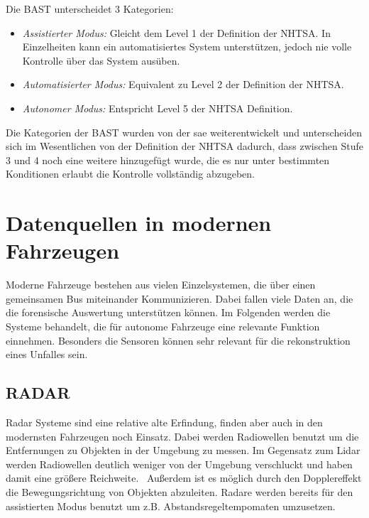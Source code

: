\documentclass[conference,compsoc,final,a4paper]{IEEEtran}
\begin{document}
Die \ac{BAST} unterscheidet 3 Kategorien\cite{bast2021}:

\begin{itemize}
  \item \emph{Assistierter Modus:} Gleicht dem Level 1 der Definition der \ac{NHTSA}. In Einzelheiten kann ein automatisiertes System unterstützen, jedoch nie volle Kontrolle über das System ausüben.
  \item \emph{Automatisierter Modus:} Equivalent zu Level 2 der Definition der \ac{NHTSA}.
  \item \emph{Autonomer Modus:} Entspricht Level 5 der \ac{NHTSA} Definition.
\end{itemize}

Die Kategorien der \ac{BAST} wurden von der \ac{sae} weiterentwickelt\cite{bast2021} und unterscheiden sich im Wesentlichen von der Definition der \ac{NHTSA} dadurch, dass zwischen Stufe 3 und 4 noch eine weitere hinzugefügt wurde, die es nur unter bestimmten Konditionen erlaubt die Kontrolle vollständig abzugeben\cite{SAE2021}.

\section{Datenquellen in modernen Fahrzeugen}

Moderne Fahrzeuge bestehen aus vielen Einzelsystemen, die über einen gemeinsamen Bus miteinander Kommunizieren.
Dabei fallen viele Daten an, die die forensische Auswertung unterstützen können. Im Folgenden werden die Systeme behandelt,
die für autonome Fahrzeuge eine relevante Funktion einnehmen.
Besonders die Sensoren können sehr relevant für die rekonstruktion eines Unfalles sein.


\subsection{RADAR}

Radar Systeme sind eine relative alte Erfindung, finden aber auch in den modernsten Fahrzeugen noch Einsatz.
Dabei werden Radiowellen benutzt um die Entfernungen zu Objekten in der Umgebung zu messen.
Im Gegensatz zum Lidar werden Radiowellen deutlich weniger von der Umgebung verschluckt und haben damit eine
größere Reichweite.~\cite{Neal2018} Außerdem ist es möglich durch den Dopplereffekt die Bewegungsrichtung von Objekten abzuleiten.
Radare werden bereits für den assistierten Modus benutzt um z.B. Abstandsregeltempomaten umzusetzen.
\end{document}
